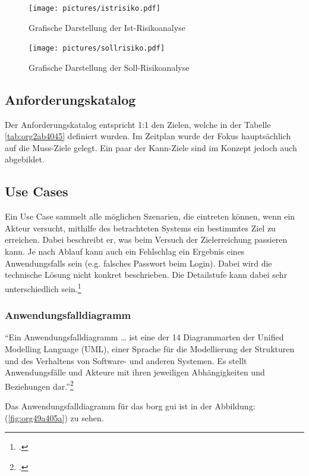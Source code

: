 \begin{figure}[H]
\centering
\texttt{[image: pictures/istrisiko.pdf]}
\caption{\label{fig:org2c84d03}
Grafische Darstellung der Ist-Risikoanalyse}
\end{figure}

\begin{figure}[H]
\centering
\texttt{[image: pictures/sollrisiko.pdf]}
\caption{\label{fig:org525577a}
Grafische Darstellung der Soll-Risikoanalyse}
\end{figure}

\newpage
\subsection{Anforderungskatalog}
\label{sec:org90be6e5}

Der Anforderungskatalog entspricht 1:1 den Zielen, welche in der Tabelle
\ref{tab:org2ab4045} definiert wurden. Im Zeitplan wurde der Fokus hauptsächlich
auf die Muss-Ziele gelegt. Ein paar der Kann-Ziele sind im Konzept jedoch auch
abgebildet.

\subsection{Use Cases}
\label{sec:orgfd94eff}

Ein Use Case sammelt alle möglichen Szenarien, die eintreten können,
wenn ein Akteur versucht, mithilfe des betrachteten Systems ein
bestimmtes Ziel zu erreichen. Dabei beschreibt er, was beim Versuch der
Zielerreichung passieren kann. Je nach Ablauf kann auch ein Fehlschlag
ein Ergebnis eines Anwendungsfalls sein (e.g. falsches Passwort beim
Login). Dabei wird die technische Lösung nicht konkret beschrieben.
Die Detailstufe kann dabei sehr unterschiedlich sein.\footcite{usecase}

\subsubsection{Anwendungsfalldiagramm}
\label{sec:org1c2414b}

"`Ein Anwendungsfalldiagramm \ldots{} ist eine der 14 Diagrammarten der
Unified Modelling Language (UML), einer Sprache für die Modellierung
der Strukturen und des Verhaltens von Software- und anderen Systemen.
Es stellt Anwendungsfälle und Akteure mit ihren jeweiligen
Abhängigkeiten und Beziehungen dar."'\footcite{usecasediagramm}

Das Anwendungsfalldiagramm für das \gls{borg} \gls{gui} ist in der Abbildung:
(\ref{fig:org49a405a}) zu sehen.


